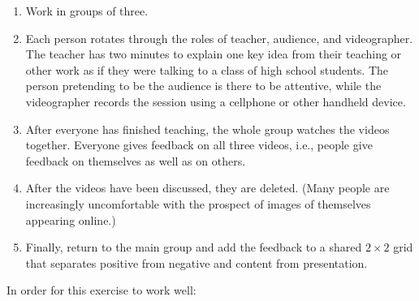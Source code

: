 \begin{enumerate}

\item
  Work in groups of three.

\item
  Each person rotates through the roles of teacher, audience, and
  videographer. The teacher has two minutes to explain one key idea
  from their teaching or other work as if they were talking to a class
  of high school students. The person pretending to be the audience is
  there to be attentive, while the videographer records the session
  using a cellphone or other handheld device.

\item
  After everyone has finished teaching, the whole group watches the
  videos together. Everyone gives feedback on all three videos, i.e.,
  people give feedback on themselves as well as on others.

\item
  After the videos have been discussed, they are deleted.  (Many
  people are increasingly uncomfortable with the prospect of images of
  themselves appearing online.)

\item
  Finally, return to the main group and add the feedback to a shared
  $2{\times}2$ grid that separates positive from negative and content
  from presentation.

\end{enumerate}

In order for this exercise to work well:

